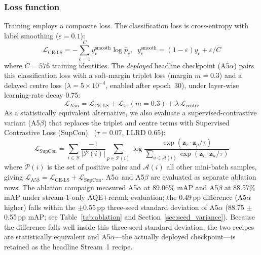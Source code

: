 \documentclass[10pt,a4paper]{article}
\begin{document}
\subsubsection{Loss function}
Training employs a composite loss. The classification loss is cross-entropy
with label smoothing ($\varepsilon = 0.1$):
\begin{equation}
  \mathcal{L}_{\mathrm{CE\text{-}LS}} =
    -\sum_{c=1}^{C} y_c^{\mathrm{smooth}} \log \hat{p}_c, \;\;
    y_c^{\mathrm{smooth}} = (1{-}\varepsilon)y_c + \varepsilon/C
  \label{eq:cels}
\end{equation}
where $C = 576$ training identities. The \emph{deployed} headline checkpoint
(A5$\alpha$) pairs this classification loss with a soft-margin triplet loss
(margin $m{=}0.3$) and a delayed centre loss ($\lambda{=}5\times10^{-4}$,
enabled after epoch~30), under layer-wise learning-rate decay 0.75:
\begin{equation}
  \mathcal{L}_{\mathrm{A5\alpha}} =
    \mathcal{L}_{\mathrm{CE\text{-}LS}}
    + \mathcal{L}_{\mathrm{tri}}(m{=}0.3)
    + \lambda\,\mathcal{L}_{\mathrm{centre}}
  \label{eq:a5alpha}
\end{equation}
As a statistically equivalent alternative, we also evaluate a
supervised-contrastive variant (A5$\beta$) that replaces the triplet and centre
terms with Supervised Contrastive Loss (SupCon)~\cite{khosla2020supcon}
($\tau = 0.07$, LLRD 0.65):
\begin{equation}
  \mathcal{L}_{\mathrm{SupCon}} =
    \sum_{i \in \mathcal{B}}
      \frac{-1}{|\mathcal{P}(i)|}
      \sum_{p \in \mathcal{P}(i)}
        \log
        \frac{\exp(\mathbf{z}_i \cdot \mathbf{z}_p / \tau)}
             {\sum_{a \in \mathcal{A}(i)} \exp(\mathbf{z}_i \cdot \mathbf{z}_a / \tau)}
  \label{eq:supcon}
\end{equation}
where $\mathcal{P}(i)$ is the set of positive pairs and $\mathcal{A}(i)$ all
other mini-batch samples, giving
$\mathcal{L}_{\mathrm{A5\beta}} = \mathcal{L}_{\mathrm{CE\text{-}LS}} +
\mathcal{L}_{\mathrm{SupCon}}$. A5$\alpha$ and A5$\beta$ are evaluated as
separate ablation rows. The ablation campaign measured A5$\alpha$ at 89.06\%
mAP and A5$\beta$ at 88.57\% mAP under stream-1-only AQE$+$rerank evaluation;
the 0.49\,pp difference (A5$\alpha$ higher) falls within the $\pm 0.55$\,pp
three-seed standard deviation of A5$\alpha$ (88.75 $\pm$ 0.55\,pp mAP; see
Table~\ref{tab:ablation} and Section~\ref{sec:seed_variance}). Because the
difference falls well inside this three-seed standard deviation, the two
recipes are statistically equivalent and A5$\alpha$---the actually deployed
checkpoint---is retained as the headline Stream~1 recipe.
\end{document}
